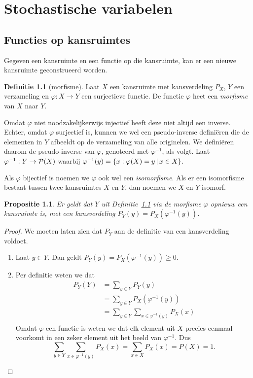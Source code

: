 \documentclass[a4paper]{book}
\newtheorem{proposition}[theorem]{Propositie}
\theoremstyle{definition}
\newtheorem{definition}[theorem]{Definitie}
\begin{document}
\chapter{Stochastische variabelen}


\section{Functies op kansruimtes}
Gegeven een kansruimte en een functie op die kansruimte, kan er een nieuwe kansruimte geconstrueerd worden.

\begin{definition}[morfisme]\label{morfisme}
    Laat $X$ een kansruimte met kansverdeling $P_X$, $Y$ een verzameling en $\varphi : X \to Y$ een surjectieve functie.
    De functie $\varphi$ heet een \emph{morfisme} van $X$ naar $Y$.

    Omdat $\varphi$ niet noodzakelijkerwijs injectief heeft deze niet altijd een inverse.
    Echter, omdat $\varphi$ surjectief is, kunnen we wel een pseudo-inverse defini\"eren die de elementen in $Y$ afbeeldt op de verzameling van alle originelen.
    We defini\"eren daarom de pseudo-inverse van $\varphi$, genoteerd met $\varphi^{-1}$, als volgt.
    Laat $\varphi^{-1} : Y \to \powerset{X}$ waarbij $\varphi^{-1}(y) = \set{x : \varphi(X) = y}{x \in X}$.

    Als $\varphi$ bijectief is noemen we $\varphi$ ook wel een \emph{isomorfisme}.
    Als er een isomorfisme bestaat tussen twee kansruimtes $X$ en $Y$, dan noemen we $X$ en $Y$ isomorf.
\end{definition}

\begin{proposition}
    Er geldt dat $Y$ uit Definitie~\ref{morfisme} via de morfisme $\varphi$ opnieuw een kansruimte is, met een kansverdeling $P_Y(y) = P_X(\varphi^{-1}(y))$.
\end{proposition}
\begin{proof}
    We moeten laten zien dat $P_Y$ aan de definitie van een kansverdeling voldoet.

    \begin{enumerate}[i]
        \item Laat $y \in Y$. Dan geldt $P_Y(y) =  P_X(\varphi^{-1}(y)) \geq 0$.
        \item Per definitie weten we dat
        \begin{align*}
            P_Y(Y) &= \sum_{y \in Y} P_Y(y) \\
                   &= \sum_{y \in Y} P_X(\varphi^{-1}(y)) \\
                   &= \sum_{y \in Y} \sum_{x \in \varphi^{-1}(y)} P_X(x) \\
        \end{align*}
        Omdat $\varphi$ een functie is weten we dat elk element uit $X$ precies eenmaal voorkomt in een zeker element uit het beeld van $\varphi^{-1}$.
        Dus \[ \sum_{y \in Y} \sum_{x \in \varphi^{-1}(y)} P_X(x) = \sum_{x \in X} P_X(x) = P(X) = 1. \]
    \end{enumerate}
\end{proof}
\end{document}
